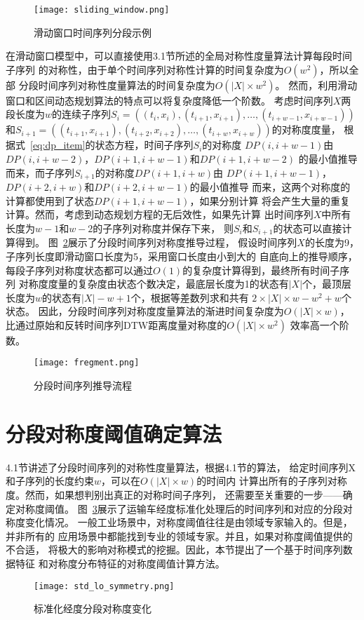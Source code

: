 \begin{figure}[h]
  \centering
  \texttt{[image: sliding\_window.png]}
  \caption{滑动窗口时间序列分段示例}
  \label{fig:sliding_window}
\end{figure}

在滑动窗口模型中，可以直接使用3.1节所述的全局对称性度量算法计算每段时间子序列
的对称性，由于单个时间序列对称性计算的时间复杂度为$O(w^2 )$，所以全部
分段时间序列对称性度量算法的时间复杂度为$O\left(|X| \times w^{2}\right)$。
然而，利用滑动窗口和区间动态规划算法的特点可以将复杂度降低一个阶数。
考虑时间序列$X$两段长度为$w$的连续子序列$S_{i}=\left(\left(t_{i}, x_{i}\right),\left(t_{i+1}, x_{i+1}\right), \dots,\left(t_{i+w-1}, x_{i+w-1}\right)\right)$
和$S_{i+1}=\left(\left(t_{i+1}, x_{i+1}\right),\left(t_{i+2}, x_{i+2}\right), \dots,\left(t_{i+w}, x_{i+w}\right)\right)$的对称度度量，
根据式~\ref{eq:dp_item}的状态方程，时间子序列$S_i$的对称度
$D P(i, i+w-1)$由$DP(i,i+w-2)$，$DP(i+1,i+w-1)$和$DP(i+1,i+w-2)$
的最小值推导而来，而子序列$S_{i+1}$的对称度$D P(i+1, i+w)$由
$D P(i+1, i+w-1)$，$DP(i+2,i+w)$和$DP(i+2,i+w-1)$的最小值推导
而来，这两个对称度的计算都使用到了状态$DP(i+1,i+w-1)$，如果分别计算
将会产生大量的重复计算。然而，考虑到动态规划方程的无后效性，如果先计算
出时间序列$X$中所有长度为$w-1$和$w-2$的子序列对称度并保存下来，
则$S_i$和$S_{i+1}$的状态可以直接计算得到。
图~\ref{fig:fregment}展示了分段时间序列对称度推导过程，
假设时间序列$X$的长度为9，子序列长度即滑动窗口长度为5，采用窗口长度由小到大的
自底向上的推导顺序，每段子序列对称度状态都可以通过$O(1)$的复杂度计算得到，最终所有时间子序列
对称度度量的复杂度由状态个数决定，最底层长度为1的状态有$|X|$个，最顶层
长度为$w$的状态有$|X|-w+1$个，根据等差数列求和共有
$2 \times|X| \times w-w^{2}+w$个状态。
因此，分段时间序列对称度度量算法的渐进时间复杂度为$O(|X| \times w)$，
比通过原始和反转时间序列DTW距离度量对称度的$O\left(|X| \times w^{2}\right)$
效率高一个阶数。
\begin{figure}
  \centering
  \texttt{[image: fregment.png]}
  \caption{分段时间序列推导流程}
  \label{fig:fregment}
\end{figure}

\section{分段对称度阈值确定算法}
4.1节讲述了分段时间序列的对称性度量算法，根据4.1节的算法，
给定时间序列X和子序列的长度约束$w$，可以在$O(|X| \times w)$的时间内
计算出所有的子序列对称度。然而，如果想判别出真正的对称时间子序列，
还需要至关重要的一步——确定对称度阈值。
图~\ref{fig:lontitude_symmetry}展示了运输车经度标准化处理后的时间序列和对应的分段对称度变化情况。
一般工业场景中，对称度阈值往往是由领域专家输入的。但是，并非所有的
应用场景中都能找到专业的领域专家。并且，如果对称度阈值提供的不合适，
将极大的影响对称模式的挖掘。因此，本节提出了一个基于时间序列数据特征
和对称度分布特征的对称度阈值计算方法。
\begin{figure}
  \centering
  \texttt{[image: std\_lo\_symmetry.png]}
  \caption{标准化经度分段对称度变化}
  \label{fig:lontitude_symmetry}
\end{figure}

